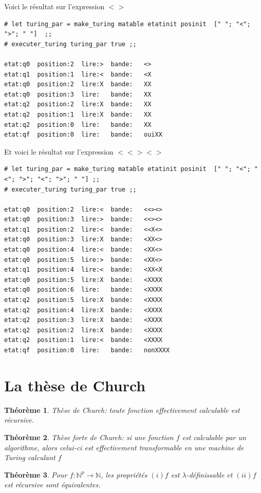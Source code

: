 \documentclass[11pt]{book}
\newtheorem{theoreme}{Théorème}
\begin{document}
Voici le résultat sur l'expression $ <> $
\begin{Verbatim}
# let turing_par = make_turing matable etatinit posinit  [" "; "<"; ">"; " "]  ;;
# executer_turing turing_par true ;;

etat:q0  position:2  lire:>  bande:   <> 
etat:q1  position:1  lire:<  bande:   <X 
etat:q0  position:2  lire:X  bande:   XX 
etat:q0  position:3  lire:   bande:   XX  
etat:q2  position:2  lire:X  bande:   XX  
etat:q2  position:1  lire:X  bande:   XX  
etat:q2  position:0  lire:   bande:   XX  
etat:qf  position:0  lire:   bande:   ouiXX  
\end{Verbatim}

Et voici le résultat sur l'expression $ <<><> $
\begin{Verbatim}
# let turing_par = make_turing matable etatinit posinit  [" "; "<"; "<"; ">"; "<"; ">"; " "] ;;
# executer_turing turing_par true ;;

etat:q0  position:2  lire:<  bande:   <<><> 
etat:q0  position:3  lire:>  bande:   <<><> 
etat:q1  position:2  lire:<  bande:   <<X<> 
etat:q0  position:3  lire:X  bande:   <XX<> 
etat:q0  position:4  lire:<  bande:   <XX<> 
etat:q0  position:5  lire:>  bande:   <XX<> 
etat:q1  position:4  lire:<  bande:   <XX<X 
etat:q0  position:5  lire:X  bande:   <XXXX 
etat:q0  position:6  lire:   bande:   <XXXX  
etat:q2  position:5  lire:X  bande:   <XXXX  
etat:q2  position:4  lire:X  bande:   <XXXX  
etat:q2  position:3  lire:X  bande:   <XXXX  
etat:q2  position:2  lire:X  bande:   <XXXX  
etat:q2  position:1  lire:<  bande:   <XXXX  
etat:qf  position:0  lire:   bande:   nonXXXX  
\end{Verbatim}
\section{La thèse de Church}
\begin{theoreme}
	Thèse de Church: toute fonction effectivement calculable est récursive.
\end{theoreme}
\begin{theoreme}
	Thèse forte de Church: si une fonction $f$ est calculable par un algorithme, 
	alors celui-ci est effectivement transformable en une machine de Turing 
	calculant $f$
\end{theoreme}
\begin{theoreme}
  Pour $f:\mathbb{N}^p \rightarrow \mathbb{N}$, les propriétés $(i) f$ est $\lambda$-définissable et 
  $(ii) f$ est récursive sont équivalentes.
\end{theoreme}
\end{document}
